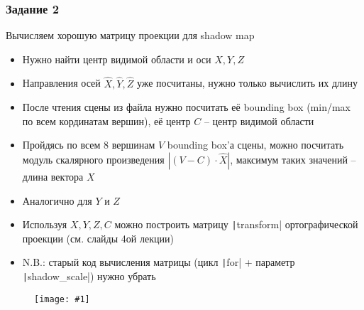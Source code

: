 \documentclass[10pt]{beamer}
\newcommand{\slideimage}[1]{
  \begin{figure}
    \begin{adjustbox}{width=\textwidth, totalheight=\textheight-2\baselineskip-2\baselineskip,keepaspectratio}
      \texttt{[image: \#1]}
    \end{adjustbox}
  \end{figure}
}
\begin{document}
\begin{frame}[fragile]
\frametitle{Задание 2}
Вычисляем хорошую матрицу проекции для shadow map
\begin{itemize}
\item Нужно найти центр видимой области и оси \begin{math}X, Y, Z\end{math}
\item Направления осей \begin{math}\hat X, \hat Y, \hat Z\end{math} уже посчитаны, нужно только вычислить их длину
\item После чтения сцены из файла нужно посчитать её bounding box (min/max по всем кординатам вершин), её центр \begin{math}C\end{math} -- центр видимой области
\item Пройдясь по всем 8 вершинам \begin{math}V\end{math} bounding box'а сцены, можно посчитать модуль скалярного произведения \begin{math}|(V - C) \cdot \hat X|\end{math}, максимум таких значений -- длина вектора \begin{math}X\end{math}
\item Аналогично для \begin{math}Y\end{math} и \begin{math}Z\end{math}
\item Используя \begin{math}X,Y,Z,C\end{math} можно построить матрицу \texttt|transform| ортографической проекции (см. слайды 4ой лекции)
\item N.B.: старый код вычисления матрицы (цикл \texttt|for| + параметр \texttt|shadow_scale|) нужно убрать
\end{itemize}
\end{frame}

\begin{frame}[fragile]
\slideimage{2.png}
\end{frame}
\end{document}
